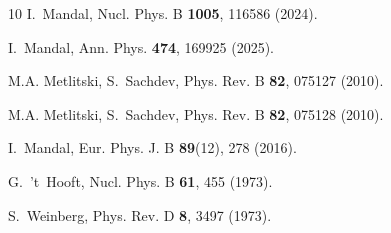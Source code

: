 \begin{thebibliography}{10}
I.~Mandal, Nucl. Phys. B \textbf{1005}, 116586 (2024).
\newblock {}

I.~{Mandal}, Ann. Phys. \textbf{474}, 169925 (2025).
\newblock {}

M.A. Metlitski, S.~Sachdev, Phys. Rev. B \textbf{82}, 075127 (2010).
\newblock {}

M.A. Metlitski, S.~Sachdev, Phys. Rev. B \textbf{82}, 075128 (2010).
\newblock {}

I.~Mandal, Eur. Phys. J. B \textbf{89}(12), 278 (2016).
\newblock {}

G.~'t~Hooft, Nucl. Phys. B \textbf{61}, 455 (1973).
\newblock {}

S.~Weinberg, Phys. Rev. D \textbf{8}, 3497 (1973).
\newblock {}

\end{thebibliography}

